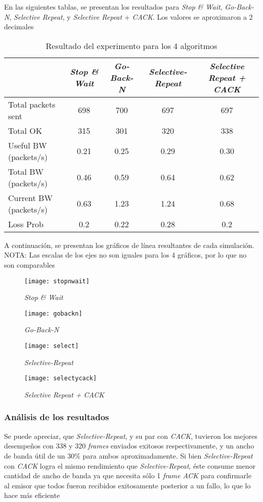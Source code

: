 \documentclass{article}
\begin{document}
En las siguientes tablas, se presentan los resultados para \textit{Stop \& Wait}, \textit{Go-Back-N}, \textit{Selective Repeat}, y \textit{Selective Repeat} + \textit{CACK}. Los valores se aproximaron a 2 decimales
\begin{table}[ht]
\centering
\caption{Resultado del experimento para los 4 algoritmos}
\begin{tabular}[t]{lcccc}
\hline
&\textit{Stop \& Wait}&\textit{Go-Back-N}&\textit{Selective-Repeat}&\textit{Selective Repeat + CACK}\\
\hline
Total packets sent&        698  & 700 & 697 & 697 \\
Total OK&                         315 & 301 & 320 & 338 \\
Useful BW (packets/s)&    0.21 & 0.25 & 0.29 & 0.30 \\
Total BW (packets/s)&      0.46 & 0.59 & 0.64 & 0.62 \\
Current BW (packets/s)&  0.63 & 1.23 & 1.24 & 0.68 \\
Loss Prob&                       0.2  & 0.22 & 0.28  & 0.2 \\
\hline
\end{tabular}
\end{table}

A continuación, se presentan los gráficos de línea resultantes de cada simulación. NOTA: Las escalas de los ejes no son iguales para los 4 gráficos, por lo que no son comparables

\begin{figure}[H]
\centering
\texttt{[image: stopnwait]}
\caption{\textit{Stop \& Wait}}
\texttt{[image: gobackn]}
\caption{\textit{Go-Back-N}}
\end{figure}

\begin{figure}[H]
\centering
\texttt{[image: select]}
\caption{\textit{Selective-Repeat}}
\texttt{[image: selectycack]}
\caption{\textit{Selective Repeat + CACK}}
\end{figure}

\subsubsection{Análisis de los resultados}
Se puede apreciar, que \textit{Selective-Repeat}, y su par con \textit{CACK}, tuvieron los mejores desempeños con 338 y 320 \textit{frames} enviados exitosos respectivamente, y un ancho de banda útil de un 30\% para ambos aproximadamente. Si bien \textit{Selective-Repeat} con \textit{CACK} logra el mismo rendimiento que \textit{Selective-Repeat}, éste consume menor cantidad de ancho de banda ya que necesita sólo 1 \textit{frame ACK} para confirmarle al emisor que todos fueron recibidos exitosamente posterior a un fallo, lo que lo hace más eficiente
\end{document}
